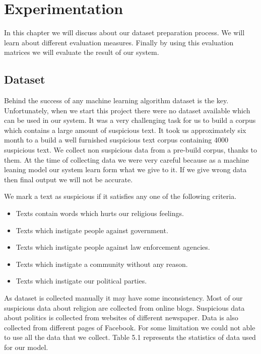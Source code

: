 \chapter{Experimentation}
\thispagestyle{empty}
In this chapter we will discuss about our dataset preparation process. We will learn about different evaluation measures. Finally by using this evaluation matrices we will evaluate the result of our system.

\section{Dataset}
Behind the success of any machine learning algorithm dataset is the key. Unfortunately, when we start this project there were no dataset available which can be used in our system. It was a very challenging task for us to build a corpus which contains a large amount of suspicious text. It took us approximately  six month to a build a well furnished  suspicious text corpus containing 4000 suspicious text. We collect non suspicious data from a pre-build corpus\cite{banglacorpus}, thanks to them. At the time of collecting data we were very careful because as a machine leaning model our system learn form what we give to it. If we give wrong data then final output we will not be accurate. \par \vspace{0.5cm}\noindent 
We mark a text as suspicious if it satisfies any one of the following criteria.

\begin{itemize}
    \item Texts contain words which hurts our religious feelings.
    \item Texts which instigate people against government.
    \item Texts which instigate people against law enforcement agencies.
    \item Texts which instigate a community without any reason.
    \item Texts which instigate our political parties. 
    
\end{itemize}
As dataset is collected manually it may have some inconsistency.
\clearpage
\noindent
Most of our suspicious data about religion are collected from online blogs\cite{nastikya, dhormo, istishon}. Suspicious data about politics is collected from websites of different newspaper\cite{palo, kk, juga}. Data is also collected from different pages of Facebook\cite{bash}. For some limitation we could not able to use all the data that we collect. Table 5.1 represents the statistics of data used for our model.

